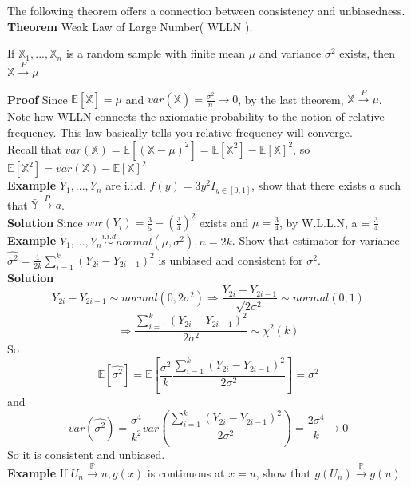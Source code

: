 The following theorem offers a connection between consistency and unbiasedness.\\

\textbf{Theorem} Weak Law of Large Number( WLLN ).

If $\mathbb{X}_1, ..., \mathbb{X}_n$ is a random sample with finite mean $\mu$ and variance $\sigma^2$ exists, then $\bar{\mathbb{X}} \overset{P}{\to} \mu$

\textbf{Proof} Since $\mathbb{E}[\bar{\mathbb{X}}] = \mu$ and $var(\bar{\mathbb{X}}) = \frac{\sigma^2}{n} \to 0$, by the last theorem, $\bar{\mathbb{X}} \overset{P}{\to} \mu$.\\

Note how WLLN connects the axiomatic probability to the notion of relative frequency. This law basically tells you relative frequency will converge.\\

Recall that $var(\mathbb{X}) = \mathbb{E}[(\mathbb{X}-\mu)^2] = \mathbb{E}[\mathbb{X}^2] - \mathbb{E}[\mathbb{X}]^2$, so $ \mathbb{E}[\mathbb{X}^2] = var(\mathbb{X}) - \mathbb{E}[\mathbb{X}]^2$\\

\textbf{Example} $Y_1, ..., Y_n$ are i.i.d. $f(y) = 3y^2 I_{y\in[0,1]}$, show that there exists $a$ such that $\bar{\mathbb{Y}} \overset{P} {\to} a$.\\
\textbf{Solution} Since $var(Y_i) = \frac{3}{5}-(\frac{3}{4})^2$ exists and $\mu = \frac{3}{4}$, by W.L.L.N, a = $\frac{3}{4}$\\

\textbf{Example} $Y_1, ..., Y_n \overset{i.i.d}{\sim} normal(\mu, \sigma^2), n=2k$. Show that estimator for variance $\hat{\sigma^2} = \frac{1}{2k}\sum_{i=1}^k(Y_{2i} - Y_{2i-1})^2$ is unbiased and consistent for $\sigma^2$.\\

\textbf{Solution}
$$Y_{2i} - Y_{2i-1} \sim normal(0, 2\sigma^2) \Rightarrow \frac{Y_{2i} - Y_{2i-1}}{\sqrt{2\sigma^2}} \sim normal(0, 1)$$
$$\Rightarrow\frac{\sum_{i=1}^k(Y_{2i} - Y_{2i-1})^2}{2\sigma^2} \sim \chi^2(k)$$
So
$$\mathbb{E}[ \hat{\sigma^2} ] = \mathbb{E}[\frac{\sigma^2}{k} \frac{\sum_{i=1}^k(Y_{2i} - Y_{2i-1})^2}{2\sigma^2}] = \sigma^2$$
and
$$var(\hat{\sigma^2}) = \frac{\sigma^4}{k^2} var(  \frac{\sum_{i=1}^k(Y_{2i} - Y_{2i-1})^2}{2\sigma^2} ) = \frac{2\sigma^4}{k} \to 0$$
So it is consistent and unbiased.\\

\textbf{Example} If $U_n \overset{\mathbb{P}}{\to} u, g(x)$ is continuous at $x=u$, show that $g(U_n) \overset{\mathbb{P}}{\to} g(u)$\\

